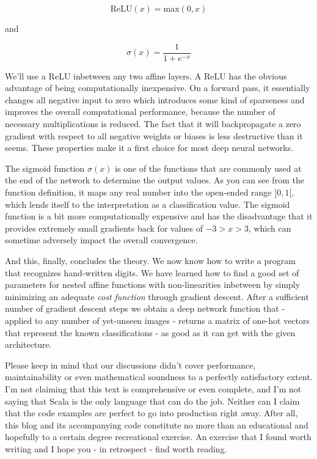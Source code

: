 \documentclass[]{report}
\begin{document}
\begin{equation}
 \text{ReLU}(x) = \text{max}(0, x) 
\end{equation}

and

\begin{equation}
\sigma(x) = \frac{1}{1+e^{-x}} 
\end{equation}

We'll use a ReLU inbetween any two affine layers. A ReLU has the obvious advantage of being computationally inexpensive. On a forward pass, it essentially changes all negative input to zero which introduces some kind of sparseness and improves the overall computational performance, because the number of necessary multiplications is reduced. The fact that it will backpropagate a zero gradient with respect to all negative weights or biases is less destructive than it seems. These properties make it a first choice for most deep neural networks. 

The sigmoid function \(\sigma(x) \) is one of the functions that are commonly used at the end of the network to determine the output values. As you can see from the function definition, it maps any real number into the open-ended range \(]0, 1[ \), which lends itself to the interpretation as a classification value. The sigmoid function is a bit more computationally expensive and has the disadvantage that it provides extremely small gradients back for values of \( -3 > x > 3\), which can sometime adversely impact the overall convergence.

\bigskip

And this, finally, concludes the theory. We now know how to write a program that recognizes hand-written digits. We have learned how to find a good set of parameters for nested affine functions with non-linearities inbetween by simply minimizing an adequate \emph{cost function} through gradient descent.
After a sufficient number of gradient descent steps we obtain a deep network function that - applied to any number of yet-unseen images - returns a matrix of one-hot vectors that represent the known classifications - as good as it can get with the given architecture.  

\bigskip


Please keep in mind that our discussions didn't cover performance, maintainability or even mathematical soundness to a perfectly satisfactory extent. I'm not claiming that this text is comprehensive or even complete, and I'm not saying that Scala is the only language that can do the job. Neither can I claim that the code examples are perfect to go into production right away. After all, this blog and its accompanying code constitute no more than an educational and hopefully to a certain degree recreational exercise. An exercise that I found worth writing and I hope you - in retrospect - find worth reading.
\end{document}
